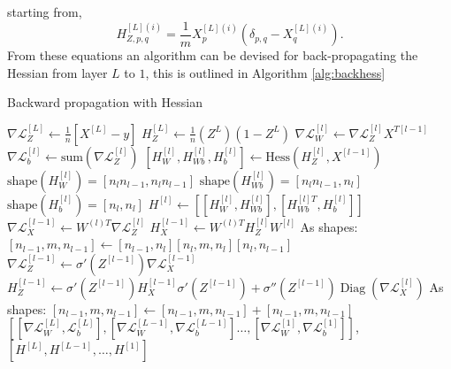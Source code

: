 \documentclass[11pt,twocolumn]{article}
\DeclareMathOperator*{\Diag}{Diag}
\begin{document}
starting from,
\begin{equation}
H_{Z,p,q}^{[L](i)}=\frac{1}{m} X^{[L](i)}_p\left(\delta_{p,q}-X^{[L](i)}_q \right)\label{H_Z_initial}.
\end{equation}
From these equations an algorithm can be devised for back-propagating the Hessian from layer $L$ to $1$, this is outlined in Algorithm \ref{alg:backhess}
\begin{algorithm}
\caption{Backward propagation with Hessian}\label{alg:backhess}
\begin{algorithmic}
\Procedure {backwardhessprop}{\textit{list(array)} $W=[W^1,W^2,\ldots, W^L]$,\textit{list(array)} $Z=[X^{[L]}, X^{[L-1]},\ldots,X^{[0]}$, $\textrm{array}(m)$ $y$}
	\State $\nabla \mathcal{L}^{[L]}_{Z} \gets \frac{1}{n}\left[X^{[L]}-y \right]$
	\State $H^{[L]}_{Z} \gets \frac{1}{n}(Z^{L})(1-Z^{L})$	
		\State $\nabla \mathcal{L}^{[l]}_{W} \gets  \nabla \mathcal{L}^{[l]}_{Z}X^{T[l-1]} $
		\State $\nabla \mathcal{L}^{[l]}_{b} \gets \textrm{sum}{(\nabla \mathcal{L}^{[l]}_{Z})}$
		\State $[H^{[l]}_W,H^{[l]}_{Wb},H^{[l]}_b] \gets \textrm{Hess}(H^{[l]}_Z, X^{[l-1]})$
		\State \Comment $\textrm{shape}(H^{[l]}_W)=[n_{l}n_{l-1},n_{l}n_{l-1}]$
		\State \Comment $\textrm{shape}(H^{[l]}_{Wb})=[n_{l}n_{l-1},n_{l}]$
		\State \Comment $\textrm{shape}(H^{[l]}_{b})=[n_{l},n_{l}]$			
		\State $H^{[l]} \gets [[H^{[l]}_W,H^{[l]}_{Wb}],[H^{[l]T}_{Wb},H^{[l]}_b]]$	
		\State $\nabla \mathcal{L}^{[l-1]}_{X} \gets W^{(l)T}\nabla \mathcal{L}^{[l]}_{Z}$
		\State $H^{[l-1]}_{X} \gets W^{(l)T} H_Z^{[l]}W^{[l]}$			
		\State \Comment As shapes: $[n_{l-1},m,n_{l-1}] \gets [n_{l-1},n_l] [n_{l},m,n_{l}] [n_l, n_{l-1}]$	
		\State $\nabla \mathcal{L}_{Z}^{[l-1]}\gets \sigma'{(Z^{[l-1]})} \nabla \mathcal{L}_{X}^{[l-1]}$
		\State $H^{[l-1]}_{Z} \gets \sigma'{(Z^{[l-1]})} H_X^{[l-1]}  \sigma'{(Z^{[l-1]})}+\sigma''{(Z^{[l-1]})} \Diag{\left(\nabla \mathcal{L}^{[l]}_{X}\right)}$
		\State \Comment As shapes: $[n_{l-1},m,n_{l-1}] \gets [n_{l-1},m,n_{l-1}] + [n_{l-1},m,n_{l-1}] $	
	\EndFor
	\State \Return $[[\nabla \mathcal{L}^{[L]}_{W} ,\mathcal{L}^{[L]}_{b} ],[ \nabla \mathcal{L}^{[L-1]}_{W},  \nabla \mathcal{L}^{[L-1]}_{b}]\ldots, [ \nabla \mathcal{L}^{[1]}_{W}, \nabla \mathcal{L}^{[1]}_{b}]]$, $[H^{[L]} ,H^{[L-1]}, \ldots, H^{[1]}]$

\end{algorithmic}
\end{algorithm}
\end{document}
